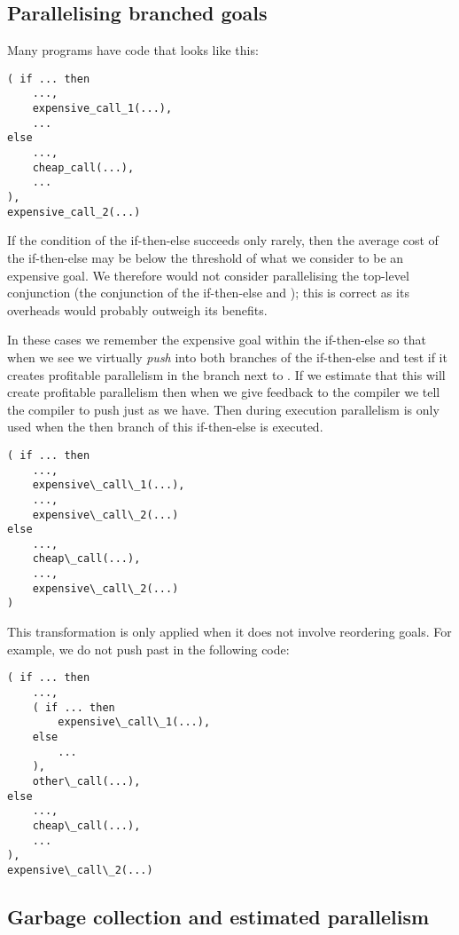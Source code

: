\subsection{Parallelising branched goals}
\label{sec:overlap_pragma_push}

Many programs have code that looks like this:
\begin{verbatim}
( if ... then
    ...,
    expensive_call_1(...),
    ...
else
    ...,
    cheap_call(...),
    ...
),
expensive_call_2(...)
\end{verbatim}
If the condition of the if-then-else succeeds only rarely,
then the average cost of the if-then-else
may be below the threshold of what we consider to be an expensive goal.
We therefore would not consider
parallelising the top-level conjunction
(the conjunction of the if-then-else and );
this is correct as its overheads would probably outweigh its benefits.

In these cases we remember the expensive goal within the if-then-else
so that when we see  we virtually \emph{push}
 into both branches of the if-then-else and test if it
creates profitable parallelism in the branch next to
.
If we estimate that this will create profitable parallelism then when we
give feedback to the compiler we tell the compiler to push
 just as we have.
Then during execution parallelism is only used when the then branch of this
if-then-else is executed.
\begin{verbatim}
( if ... then
    ...,
    expensive\_call\_1(...),
    ...,
    expensive\_call\_2(...)
else
    ...,
    cheap\_call(...),
    ...,
    expensive\_call\_2(...)
)
\end{verbatim}

This transformation is only applied when it does not involve reordering goals.
For example, we do not push  past
 in the following code:

\begin{verbatim}
( if ... then
    ...,
    ( if ... then
        expensive\_call\_1(...),
    else
        ...
    ),
    other\_call(...),
else
    ...,
    cheap\_call(...),
    ...
),
expensive\_call\_2(...)
\end{verbatim}

\subsection{Garbage collection and estimated parallelism}
\label{sec:overlap_pragma_gc}

